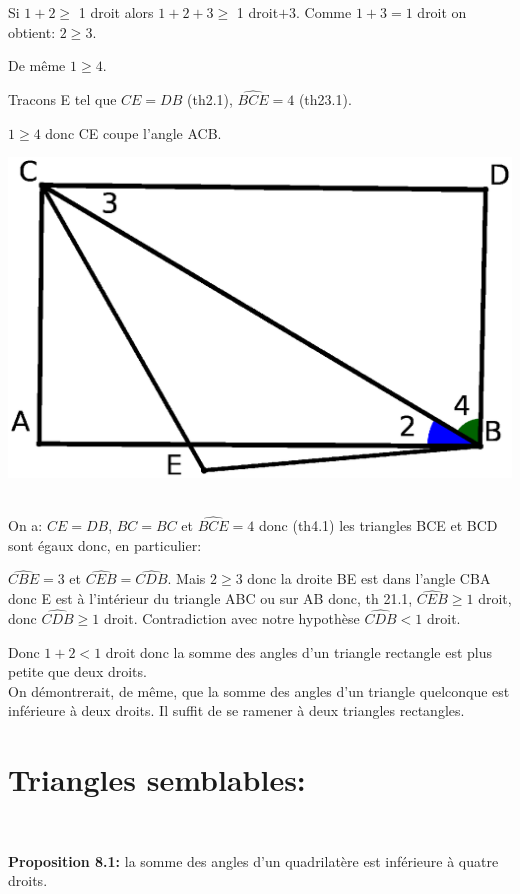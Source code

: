 \documentclass[a4paper, 12pt, twoside]{book}
\begin{document}
  Si $1+2\geq $ 1 droit alors  $1+2+3\geq$ 1 droit$+3$. Comme $1+3=1$ droit on obtient: $2\geq 3 $.\
  
  De même $1\geq 4 $.\
  
  Tracons E tel que $CE=DB$ (th2.1), $\hat{BCE}=4$ (th23.1).\ 
  
  $1\geq 4 $ donc CE coupe l'angle ACB.\
  
  
  
  
   \includegraphics[scale=0.5]{figures/Lambert2.eps} \
   
   On a: $CE=DB$, $BC=BC$ et $\hat{BCE}=4$ donc (th4.1) les triangles BCE et BCD sont égaux donc, en particulier:\
   
  $\hat{CBE}=3$ et $\hat{CEB}=\hat{CDB}$. Mais $2\geq 3 $ donc la droite BE est dans l'angle CBA donc E est à l'intérieur du triangle ABC  ou sur AB donc, th 21.1,   $\hat{CEB}\geq 1$ droit, donc $\hat{CDB}\geq 1$ droit. Contradiction avec notre hypothèse $\hat{CDB}< 1$ droit.  \
  
  Donc $1+2<1$ droit donc la somme des angles d'un triangle rectangle est plus petite que deux droits.\\
  
  
  On démontrerait, de même, que la somme des angles d'un triangle quelconque est inférieure à deux droits. Il suffit de se ramener à deux triangles rectangles.\\
  
   \section{Triangles semblables:}\
  
  
   \textbf{Proposition 8.1:} la somme des angles d'un quadrilatère est inférieure à quatre droits.\\
   
\end{document}

